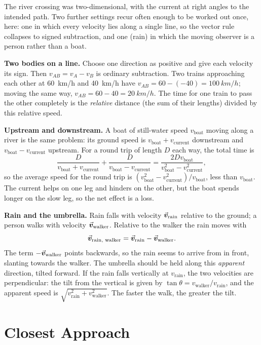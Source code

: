 The river crossing was two-dimensional, with the current at right angles to the intended path. Two
further settings recur often enough to be worked out once, here: one in which every velocity lies along
a single line, so the vector rule collapses to signed subtraction, and one (rain) in which the moving
observer is a person rather than a boat.

\textbf{Two bodies on a line.} Choose one direction as positive and give each velocity its sign. Then
$v_{AB}=v_A-v_B$ is ordinary subtraction. Two trains approaching each other at \SI{60}{km/h} and
\SI{40}{km/h} have $v_{AB}=60-(-40)=\SI{100}{km/h}$; moving the same way, $v_{AB}=60-40=\SI{20}{km/h}$.
The time for one train to pass the other completely is the \emph{relative} distance (the sum of their
lengths) divided by this relative speed.

\textbf{Upstream and downstream.} A boat of still-water speed $v_{\text{boat}}$ moving along a river is the
same problem: its ground speed is $v_{\text{boat}}+v_{\text{current}}$ downstream and
$v_{\text{boat}}-v_{\text{current}}$ upstream. For a round trip of length $D$ each way, the total time is
\[
\frac{D}{v_{\text{boat}}+v_{\text{current}}}+\frac{D}{v_{\text{boat}}-v_{\text{current}}}
=\frac{2Dv_{\text{boat}}}{v_{\text{boat}}^2-v_{\text{current}}^2},
\]
so the average speed for the round trip is $(v_{\text{boat}}^2-v_{\text{current}}^2)/v_{\text{boat}}$,
less than $v_{\text{boat}}$. The current helps on one leg and hinders on the other, but the boat spends
longer on the slow leg, so the net effect is a loss.

\textbf{Rain and the umbrella.} Rain falls with velocity $\vec{\bm{v}}_{\text{rain}}$ relative to the ground; a person
walks with velocity $\vec{\bm{v}}_{\text{walker}}$. Relative to the walker the rain moves with
\[
\vec{\bm{v}}_{\text{rain, walker}}=\vec{\bm{v}}_{\text{rain}}-\vec{\bm{v}}_{\text{walker}}.
\]
The term $-\vec{\bm{v}}_{\text{walker}}$ points backwards, so the rain seems to arrive from in front, slanting
towards the walker. The umbrella should be held along this \emph{apparent} direction, tilted forward. If the
rain falls vertically at $v_{\text{rain}}$, the two velocities are perpendicular: the tilt from the
vertical is given by $\tan\theta=v_{\text{walker}}/v_{\text{rain}}$, and the apparent speed is
$\sqrt{v_{\text{rain}}^2+v_{\text{walker}}^2}$. The faster the walk, the greater the tilt.

\section{Closest Approach}\label{sec:closest}

